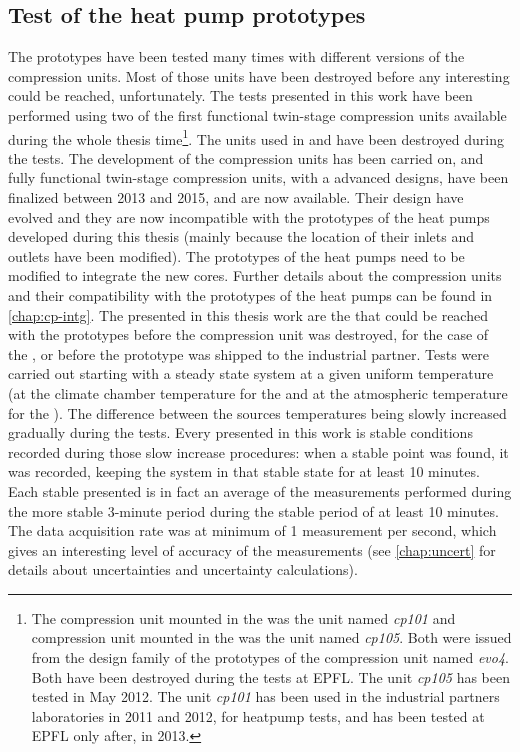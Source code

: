 \subsection{Test of the heat pump prototypes}
\label{sec:methodo-tests}

The prototypes have been tested many times with different versions of
the compression units. Most of those units have been destroyed before
any interesting \OP{} could be reached, unfortunately. The tests
presented in this work have been performed using two of the first
functional twin-stage compression units available during the whole
thesis time\footnote{The compression unit mounted in the \BWP{} was
  the unit named \textit{cp101} and compression unit mounted in the
  \AWP{} was the unit named \textit{cp105}. Both were issued from the
  design family of the prototypes of the compression unit named
  \textit{evo4}. Both have been destroyed during the tests at
  EPFL. The unit \textit{cp105} has been tested in May 2012. The unit
  \textit{cp101} has been used in the industrial partners laboratories
  in 2011 and 2012, for heatpump tests, and has been tested at EPFL
  only after, in 2013.}. The units used in \BWP{} and \AWP{} have been
destroyed during the tests. The development of the compression units
has been carried on, and fully functional twin-stage compression
units, with a advanced designs, have been finalized between 2013 and
2015, and are now available. Their design have evolved and they are
now incompatible with the prototypes of the heat pumps developed
during this thesis (mainly because the location of their inlets and
outlets have been modified). The prototypes of the heat pumps need to
be modified to integrate the new cores. Further details about the
compression units and their compatibility with the prototypes of the
heat pumps can be found in \cref{chap:cp-intg}. The \OP{} presented in
this thesis work are the \OP{} that could be reached with the
prototypes before the compression unit was destroyed, for the case of
the \BWP{}, or before the \AWP{} prototype was shipped to the
industrial partner. Tests were carried out starting with a steady
state system at a given uniform temperature (at the climate chamber
temperature for the \AWP{} and at the atmospheric temperature for the
\BWP{}). The difference between the sources temperatures being slowly
increased gradually during the tests. Every \OP{} presented in this
work is stable conditions recorded during those slow increase
procedures: when a stable point was found, it was recorded, keeping
the system in that stable state for at least 10 minutes. Each stable
\OP{} presented is in fact an average of the measurements performed
during the more stable 3-minute period during the stable period of at
least 10 minutes. The data acquisition rate was at minimum of 1
measurement per second, which gives an interesting level of accuracy
of the \OP{} measurements (see \cref{chap:uncert} for details about
uncertainties and uncertainty calculations).

